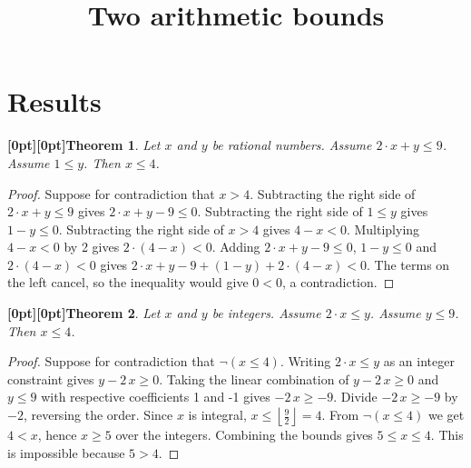 \documentclass{article}
\title{Two arithmetic bounds}
\author{}
\date{}
\makeatletter
\newcommand{\paperanchor}[1]{\hypertarget{#1}{}}%
\def\paperdest{\pdfextension dest}\def\paperstart{\pdfextension startlink}%
\def\paperend{\pdfextension endlink}\def\papercolor{\pdfextension colorstack}%
\let\paperdest\pdfdest\let\paperstart\pdfstartlink\let\paperend\pdfendlink\let\papercolor\pdfcolorstack
\newcommand{\paperanchor}[1]{\paperdest name{#1} xyz}%
\newcommand{\paperanchor}[1]{\special{pdf:dest (#1) [@thispage /XYZ null @ypos null]}}%
\newcommand{\paperlineanchor}[1]{\raisebox{10pt}[0pt][0pt]{\paperanchor{#1}}}
\DeclareRobustCommand{\paperresultname}[1]{\paperlineanchor{theorem:\arabic{theorem}}#1}
\theoremstyle{paperresult}
\newtheorem{theorem}{\paperresultname{Theorem}}
\makeatother
\begin{document}
\maketitle
\section{Results}
\begin{theorem}\label{theorem:1}
Let \(x\) and \(y\) be rational numbers. Assume \(2 \cdot x + y \le 9\). Assume \(1 \le y\). Then \(x \le 4\).
\end{theorem}

\begin{proof}
Suppose for contradiction that \(x > 4\).
Subtracting the right side of \(2 \cdot x + y \le 9\) gives \(2 \cdot x + y - 9 \le 0\).
Subtracting the right side of \(1 \le y\) gives \(1 - y \le 0\).
Subtracting the right side of \(x > 4\) gives \(4 - x < 0\).
Multiplying \(4 - x < 0\) by 2 gives \(2 \cdot \left(4 - x\right) < 0\).
Adding \(2 \cdot x + y - 9 \le 0\), \(1 - y \le 0\) and \(2 \cdot \left(4 - x\right) < 0\) gives \(2 \cdot x + y - 9 + \left(1 - y\right) + 2 \cdot \left(4 - x\right) < 0\).
The terms on the left cancel, so the inequality would give \(0 < 0\), a contradiction.
\end{proof}

\begin{theorem}\label{theorem:2}
Let \(x\) and \(y\) be integers. Assume \(2 \cdot x \le y\). Assume \(y \le 9\). Then \(x \le 4\).
\end{theorem}

\begin{proof}
Suppose for contradiction that \(\neg \left(x \le 4\right)\).
Writing \(2 \cdot x \le y\) as an integer constraint gives \(y - 2\,x \ge 0\).
Taking the linear combination of \(y - 2\,x \ge 0\) and \(y \le 9\) with respective coefficients 1 and -1 gives \(-2\,x \ge -9\).
Divide \(-2\,x \ge -9\) by \(-2\), reversing the order. Since \(x\) is integral, \(x \le \left\lfloor\frac{9}{2}\right\rfloor = 4\).
From \(\neg \left(x \le 4\right)\) we get \(4 < x\), hence \(x \ge 5\) over the integers.
Combining the bounds gives \(5 \le x \le 4\).
This is impossible because \(5 > 4\).
\end{proof}
\end{document}
